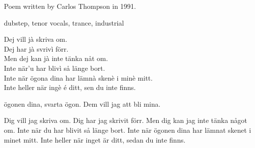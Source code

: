 

\begin{notes}
Poem written by Carlos Thompson in 1991.
\end{notes}
\begin{style}
dubstep, tenor vocals, trance, industrial
\end{style}
\begin{lyrics}
Dej vill jà skriva om.\\
Dej har jà svrivì förr.\\
Men dej kan jà inte tänka nåt om.\\
Inte när'u har blivì så länge bort.\\
Inte när ögona dina har lämnà skenè i minè mitt.\\
Inte heller när ingè é ditt, sen du inte finns.

ögonen dina, svarta ögon. Dem vill jag att bli mina.

Dig vill jag skriva om. Dig har jag skrivit förr. Men dig kan jag inte tänka något om. %
Inte när du har blivit så länge bort. Inte när ögonen dina har lämnat skenet i minet mitt. %
Inte heller när inget är ditt, sedan du inte finns.
\end{lyrics}

